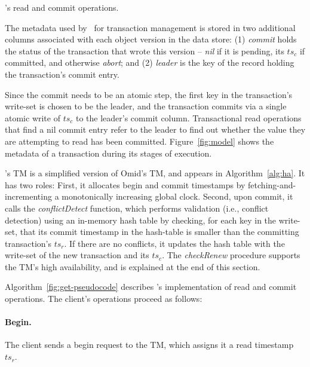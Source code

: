 \begin{algorithm}[t]
\begin{algorithmic}
  \end{algorithmic}
  \caption{\sys's read and commit operations.} 
  \label{fig:get-pseudocode}
\end{algorithm} 



The metadata used by \sys\ for transaction management is stored in two additional columns associated with each object version in the data store:
(1) \emph{commit} holds the status of the transaction that wrote this version -- \emph{nil} if it is pending, its  $ts_c$ if committed, and 
otherwise \emph{abort}; 
and
(2) \emph{leader} is the key of the record holding the transaction's commit entry.

Since the commit needs to be an atomic step, the first key in the transaction's write-set is chosen to be the leader, and the transaction commits via a single atomic write of $ts_c$ to the leader's commit column. Transactional read operations that find a nil commit entry 
refer to the leader to find out whether the value they are attempting to read has been committed.
Figure~\ref{fig:model} shows the metadata of a transaction during its stages of execution. 

\sys's TM is a simplified version of Omid's TM, and appears  in Algorithm~\ref{alg:ha}. It has two roles:
First, it allocates begin and commit timestamps by fetching-and-incrementing a monotonically increasing global clock.
Second, upon commit, it calls the \emph{conflictDetect} function, which 
performs validation (i.e., conflict detection) using an in-memory hash table
by checking, for each key in the write-set, that its commit timestamp in the hash-table is smaller than the 
committing transaction's $ts_r$. If there are no conflicts, it 
updates the hash table with the write-set of the new transaction and its $ts_c$. 
The  \emph{checkRenew} procedure supports the TM's  high availability, and is explained at the end of this section.

Algorithm~\ref{fig:get-pseudocode} describes \sys's implementation of read and commit operations.
The client's operations proceed as follows:

\paragraph{Begin.}
The client sends a begin request to the TM, which assigns it a read timestamp $ts_r$.

